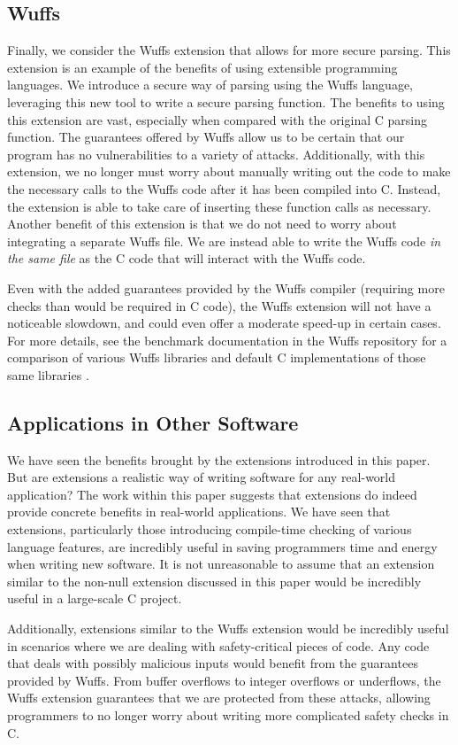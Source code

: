 \documentclass[main.tex]{subfiles}
\begin{document}
\subsection{Wuffs}
Finally, we consider the Wuffs extension that allows for more secure parsing. This extension is an example of
the benefits of using extensible programming languages. We introduce a secure way of parsing using the Wuffs language,
leveraging this new tool to write a secure parsing function. The benefits to using this extension are vast, especially when
compared with the original C parsing function. The guarantees offered by Wuffs allow us to be certain that our program has
no vulnerabilities to a variety of attacks. Additionally, with this extension, we no longer must worry about manually writing out
the code to make the necessary calls to the Wuffs code after it has been compiled into C. Instead, the extension is able to
take care of inserting these function calls as necessary. Another benefit of this extension is that we do not need to worry about
integrating a separate Wuffs file. We are instead able to write the Wuffs code \emph{in the same file} as the C code that will interact with
the Wuffs code.

Even with the added guarantees provided by the Wuffs compiler (requiring more checks than would be required in C code),
the Wuffs extension will not have a noticeable slowdown, and could even offer a moderate speed-up in certain cases. For
more details, see the benchmark documentation in the Wuffs repository for a comparison of various Wuffs libraries and
default C implementations of those same libraries \cite{5}. 

\subsection{Applications in Other Software}
We have seen the benefits brought by the extensions introduced in this paper. But are extensions a realistic way of writing
software for any real-world application? The work within this paper suggests that extensions do indeed provide concrete
benefits in real-world applications. We have seen that extensions, particularly those introducing compile-time checking of
various language features, are incredibly useful in saving programmers time and energy when writing new software. It is not
unreasonable to assume that an extension similar to the non-null extension discussed in this paper would be incredibly useful
in a large-scale C project.

Additionally, extensions similar to the Wuffs extension would be incredibly useful in scenarios where we are dealing with
safety-critical pieces of code. Any code that deals with possibly malicious inputs would benefit from the guarantees provided
by Wuffs. From buffer overflows to integer overflows or underflows, the Wuffs extension guarantees that we are protected from
these attacks, allowing programmers to no longer worry about writing more complicated safety checks in C.
\end{document}
